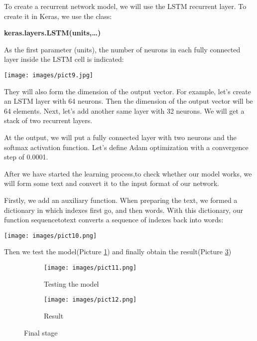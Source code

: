 \documentclass[]{article}
\begin{document}
To create a recurrent network model, we will use the LSTM recurrent layer. To create it in Keras, we use the class:

\vspace{2mm}
\textbf{keras.layers.LSTM(units,\dots)}

\vspace{2mm}
As the first parameter (units), the number of neurons in each fully connected layer inside the LSTM cell is indicated:

\vspace{2mm}
\texttt{[image: images/pict9.jpg]}

\vspace{2mm}
They will also form the dimension of the output vector. For example, let's create an LSTM layer with 64 neurons. Then the dimension of the output vector will be 64 elements. Next, let's add another same layer with 32 neurons. We will get a stack of two recurrent layers.

At the output, we will put a fully connected layer with two neurons and the softmax activation function. Let's define Adam optimization with a convergence step of 0.0001.

After we have started the learning process,to check whether our model works, we will form some text and convert it to the input format of our network.

Firstly, we add an auxiliary function. When preparing the text, we formed a dictionary in which indexes first go, and then words. With this dictionary, our function sequence\underline{\hspace{1mm}}to\underline{\hspace{1mm}}text converts a sequence of indexes back into words:

\vspace{2mm}
\texttt{[image: images/pict10.png]}

\vspace{2mm}
Then we test the model(Picture \ref{fig:figure4}) and finally obtain the result(Picture \ref{fig:figure5})

\vspace{2mm}
\begin{figure}
\begin{subfigure}{0.5\textwidth}
\texttt{[image: images/pict11.png]}
\caption{Testing the model}
\label{fig:figure4}
\end{subfigure}
\begin{subfigure}{0.5\textwidth}
\texttt{[image: images/pict12.png]}
\caption{Result}
\label{fig:figure5}
\end{subfigure}
\caption{Final stage}
\end{figure}
\end{document}
